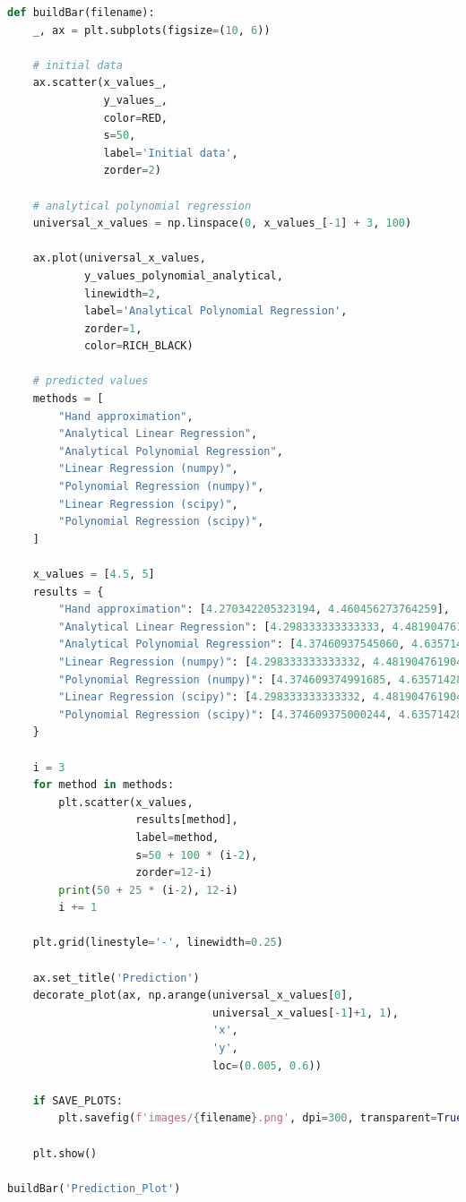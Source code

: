 \documentclass[a4paper, 14pt]{extarticle}
\begin{document}
\begin{center}
    \begin{lstlisting}[language=Python]
def buildBar(filename):
    _, ax = plt.subplots(figsize=(10, 6))

    # initial data
    ax.scatter(x_values_, 
               y_values_, 
               color=RED,
               s=50,
               label='Initial data', 
               zorder=2)

    # analytical polynomial regression
    universal_x_values = np.linspace(0, x_values_[-1] + 3, 100)

    ax.plot(universal_x_values, 
            y_values_polynomial_analytical,
            linewidth=2, 
            label='Analytical Polynomial Regression', 
            zorder=1, 
            color=RICH_BLACK)

    # predicted values
    methods = [
        "Hand approximation",
        "Analytical Linear Regression",
        "Analytical Polynomial Regression",
        "Linear Regression (numpy)",
        "Polynomial Regression (numpy)",
        "Linear Regression (scipy)",
        "Polynomial Regression (scipy)",
    ]

    x_values = [4.5, 5]
    results = {
        "Hand approximation": [4.270342205323194, 4.460456273764259],
        "Analytical Linear Regression": [4.298333333333333, 4.481904761904762],
        "Analytical Polynomial Regression": [4.37460937545060, 4.63571428619517],
        "Linear Regression (numpy)": [4.298333333333332, 4.481904761904761],
        "Polynomial Regression (numpy)": [4.374609374991685, 4.635714285706156],
        "Linear Regression (scipy)": [4.298333333333332, 4.481904761904761],
        "Polynomial Regression (scipy)": [4.374609375000244, 4.6357142857146165],
    }

    i = 3
    for method in methods:
        plt.scatter(x_values, 
                    results[method], 
                    label=method, 
                    s=50 + 100 * (i-2), 
                    zorder=12-i)
        print(50 + 25 * (i-2), 12-i)
        i += 1

    plt.grid(linestyle='-', linewidth=0.25)

    ax.set_title('Prediction')
    decorate_plot(ax, np.arange(universal_x_values[0], 
                                universal_x_values[-1]+1, 1), 
                                'x', 
                                'y', 
                                loc=(0.005, 0.6))
    
    if SAVE_PLOTS:
        plt.savefig(f'images/{filename}.png', dpi=300, transparent=True)

    plt.show()

buildBar('Prediction_Plot')
    \end{lstlisting}
\end{center}
\end{document}
